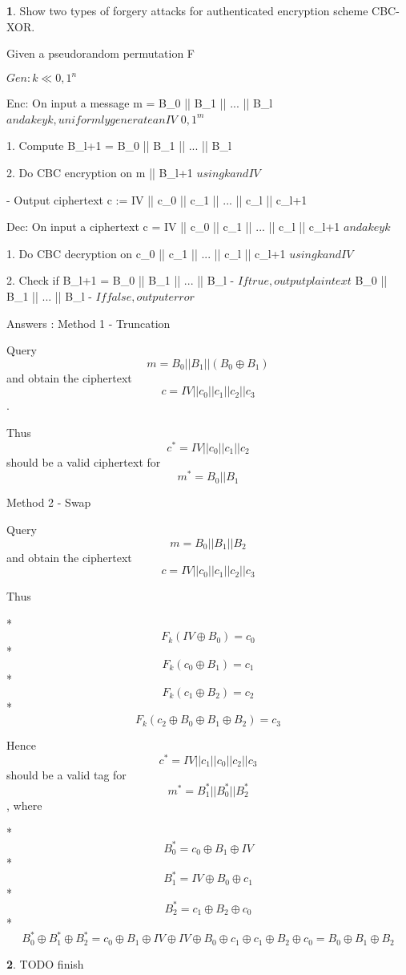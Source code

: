 \documentclass{article}
\theoremstyle{definition}
\theoremstyle{definition}
\theoremstyle{definition}
\newtheorem{solution-internal}{}[subsection]
\newenvironment{solution}{
  \begin{solution-internal}
}{
  \end{solution-internal}
}
\begin{document}
\begin{solution}
  Show two types of forgery attacks for authenticated encryption scheme CBC-XOR.
  
  Given a pseudorandom permutation F

  $Gen: k \ll {0, 1}^n$

  Enc: On input a message 
  m = B_0 || B_1 || ... || B_l \hspace{1mm} 
  $and a key k, uniformly generate an IV$  \ll ${0, 1}^m$
    
    1. Compute B_{l+1} = B_0 || B_1 || ... || B_l
    
    2. Do CBC encryption on m || B_{l+1} $using k and IV$
        
        - Output ciphertext c := IV || c_0 || c_1 || ... || c_l || c_{l+1}
        

  Dec: On input a ciphertext c = IV || c_0 || c_1 || ... || c_l || c_{l+1} $and a key k$
   
    1. Do CBC decryption on c_0 || c_1 || ... || c_l || c_{l+1} $using k and IV$
    
    2. Check if B_{l+1} = B_0 || B_1 || ... || B_l
        - $If true, output plaintext$ \hspace{1mm} B_0 || B_1 || ... || B_l
        - $If false, output error$

\newline
  Answers :
\newline
  Method 1 - Truncation

  Query $$ m = B_0 || B_1 || (B_0 \oplus B_1) $$ and obtain the ciphertext $$ c = IV || c_0 || c_1 || c_2 || c_3 $$.

  Thus $$ c^* = IV || c_0 || c_1 || c_2 $$ should be a valid ciphertext for $$m^* = B_0 || B_1$$

  Method 2 - Swap

  Query $$m = B_0 || B_1 || B_2 $$ and obtain the ciphertext $$c = IV || c_0 || c_1 || c_2 || c_3 $$

  Thus

* $$F_k(IV \oplus B_0) = c_0$$
* $$F_k(c_0 \oplus B_1) = c_1$$
* $$ F_k(c_1 \oplus B_2) = c_2 $$
* $$ F_k(c_2 \oplus B_0 \oplus B_1 \oplus B_2) = c_3 $$

Hence $$c^* = IV || c_1 || c_0 || c_2 || c_3$$ should be a valid tag for $$m^* = B^*_1 || B^*_0 || B^*_2$$, where

* $$ B^*_0 = c_0 \oplus B_1 \oplus IV$$
* $$ B^*_1 = IV \oplus B_0 \oplus c_1$$
* $$ B^*_2 = c_1 \oplus B_2 \oplus c_0$$
* $$ B^*_0 \oplus B^*_1 \oplus B^*_2 =  c_0 \oplus B_1 \oplus IV \oplus IV \oplus B_0 \oplus c_1 \oplus c_1 \oplus B_2 \oplus c_0 = B_0 \oplus B_1 \oplus B_2$$
\end{solution}
\begin{solution}
  TODO finish
\end{solution}
\end{document}
